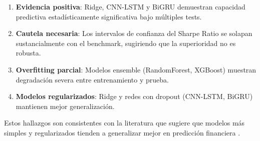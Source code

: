 \begin{enumerate}
    \item \textbf{Evidencia positiva}: Ridge, CNN-LSTM y BiGRU demuestran capacidad predictiva estad\'isticamente significativa bajo m\'ultiples tests.

    \item \textbf{Cautela necesaria}: Los intervalos de confianza del Sharpe Ratio se solapan sustancialmente con el benchmark, sugiriendo que la superioridad no es robusta.

    \item \textbf{Overfitting parcial}: Modelos ensemble (RandomForest, XGBoost) muestran degradaci\'on severa entre entrenamiento y prueba.

    \item \textbf{Modelos regularizados}: Ridge y redes con dropout (CNN-LSTM, BiGRU) mantienen mejor generalizaci\'on.
\end{enumerate}

Estos hallazgos son consistentes con la literatura que sugiere que modelos m\'as simples y regularizados tienden a generalizar mejor en predicci\'on financiera \citep{gu2020empirical}.
